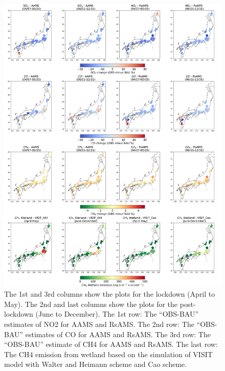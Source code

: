 \begin{figure}[p]
    \centering
    \includegraphics[width=\textwidth]{figs/chap4/fig7.png}
    \caption[NO2, CO and CH4, and HCHO variations in 2020]{The 1st and 3rd columns show the plots for the lockdown (April to May). The 2nd and last columns show the plots for the post-lockdown (June to December). The 1st row: The “OBS-BAU” estimates of NO2 for AAMS and RsAMS. The 2nd row: The “OBS-BAU” estimates of CO for AAMS and RsAMS. The 3rd row: The “OBS-BAU” estimate of CH4 for AAMS and RsAMS. The last row: The CH4 emission from wetland based on the simulation of VISIT model with Walter and Heimann scheme and Cao scheme.}
    \label{fig:chap4_fig7}
\end{figure}


